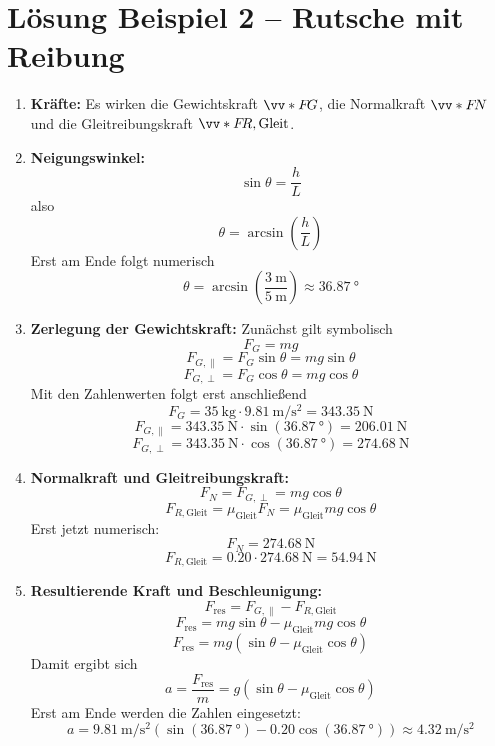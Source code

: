 \documentclass[11pt, a4paper]{article}
\begin{document}
\section*{Lösung Beispiel 2 -- Rutsche mit Reibung}
\begin{enumerate}
    \item \textbf{Kräfte:} Es wirken die Gewichtskraft $\ivecS{F}{G}$, die Normalkraft $\ivecS{F}{N}$ und die Gleitreibungskraft $\ivecS{F}{R,\text{Gleit}}$.

    \item \textbf{Neigungswinkel:} \[
        \sin\theta = \frac{h}{L}
    \]
    also
    \[
        \theta = \arcsin\left(\frac{h}{L}\right)
    \]
    Erst am Ende folgt numerisch
    \[
        \theta = \arcsin\left(\frac{\SI{3}{\metre}}{\SI{5}{\metre}}\right) \approx \SI{36.87}{\degree}
    \]

    \item \textbf{Zerlegung der Gewichtskraft:}
    Zunächst gilt symbolisch
    \[
        F_G = mg
    \]
    \[
        F_{G,\parallel} = F_G \sin\theta = mg \sin\theta
    \]
    \[
        F_{G,\perp} = F_G \cos\theta = mg \cos\theta
    \]
    Mit den Zahlenwerten folgt erst anschließend
    \[
        F_G = \SI{35}{\kilogram} \cdot \SI{9.81}{\metre\per\second\squared} = \SI{343.35}{\newton}
    \]
    \[
        F_{G,\parallel} = \SI{343.35}{\newton} \cdot \sin(\SI{36.87}{\degree}) = \SI{206.01}{\newton}
    \]
    \[
        F_{G,\perp} = \SI{343.35}{\newton} \cdot \cos(\SI{36.87}{\degree}) = \SI{274.68}{\newton}
    \]

    \item \textbf{Normalkraft und Gleitreibungskraft:} \[
        F_N = F_{G,\perp} = mg\cos\theta
    \]
    \[
        F_{R,\text{Gleit}} = \mu_{\text{Gleit}} F_N = \mu_{\text{Gleit}} mg\cos\theta
    \]
    Erst jetzt numerisch:
    \[
        F_N = \SI{274.68}{\newton}
    \]
    \[
        F_{R,\text{Gleit}} = \num{0.20} \cdot \SI{274.68}{\newton} = \SI{54.94}{\newton}
    \]

    \item \textbf{Resultierende Kraft und Beschleunigung:} \[
        F_{\text{res}} = F_{G,\parallel} - F_{R,\text{Gleit}}
    \]
    \[
        F_{\text{res}} = mg\sin\theta - \mu_{\text{Gleit}} mg\cos\theta
    \]
    \[
        F_{\text{res}} = mg\left(\sin\theta - \mu_{\text{Gleit}}\cos\theta\right)
    \]
    Damit ergibt sich
    \[
        a = \frac{F_{\text{res}}}{m} = g\left(\sin\theta - \mu_{\text{Gleit}}\cos\theta\right)
    \]
    Erst am Ende werden die Zahlen eingesetzt:
    \[
        a = \SI{9.81}{\metre\per\second\squared} \left(\sin(\SI{36.87}{\degree}) - \num{0.20}\cos(\SI{36.87}{\degree})\right) \approx \SI{4.32}{\metre\per\second\squared}
    \]


\end{enumerate}
\end{document}

